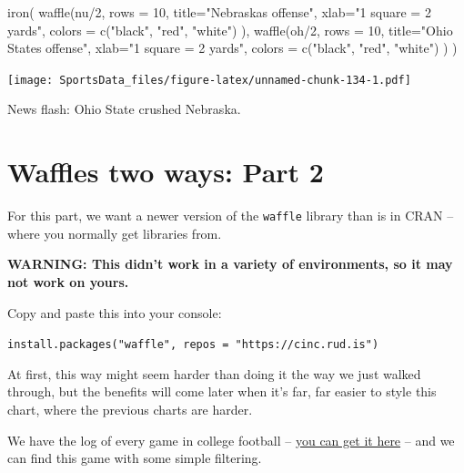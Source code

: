 \documentclass[
]{book}
\newenvironment{Shaded}{\begin{snugshade}}{\end{snugshade}}
\newcommand{\AttributeTok}[1]{\textcolor[rgb]{0.77,0.63,0.00}{#1}}
\newcommand{\DecValTok}[1]{\textcolor[rgb]{0.00,0.00,0.81}{#1}}
\newcommand{\FunctionTok}[1]{\textcolor[rgb]{0.00,0.00,0.00}{#1}}
\newcommand{\NormalTok}[1]{#1}
\newcommand{\SpecialCharTok}[1]{\textcolor[rgb]{0.00,0.00,0.00}{#1}}
\newcommand{\StringTok}[1]{\textcolor[rgb]{0.31,0.60,0.02}{#1}}
\begin{document}
\begin{Shaded}
\begin{Highlighting}[]
\FunctionTok{iron}\NormalTok{(}
 \FunctionTok{waffle}\NormalTok{(nu}\SpecialCharTok{/}\DecValTok{2}\NormalTok{, }
        \AttributeTok{rows =} \DecValTok{10}\NormalTok{, }
        \AttributeTok{title=}\StringTok{"Nebraska\textquotesingle{}s offense"}\NormalTok{, }
        \AttributeTok{xlab=}\StringTok{"1 square = 2 yards"}\NormalTok{, }
        \AttributeTok{colors =} \FunctionTok{c}\NormalTok{(}\StringTok{"black"}\NormalTok{, }\StringTok{"red"}\NormalTok{, }\StringTok{"white"}\NormalTok{)}
\NormalTok{        ),}
 \FunctionTok{waffle}\NormalTok{(oh}\SpecialCharTok{/}\DecValTok{2}\NormalTok{, }
        \AttributeTok{rows =} \DecValTok{10}\NormalTok{, }
        \AttributeTok{title=}\StringTok{"Ohio State\textquotesingle{}s offense"}\NormalTok{, }
        \AttributeTok{xlab=}\StringTok{"1 square = 2 yards"}\NormalTok{, }
        \AttributeTok{colors =} \FunctionTok{c}\NormalTok{(}\StringTok{"black"}\NormalTok{, }\StringTok{"red"}\NormalTok{, }\StringTok{"white"}\NormalTok{)}
\NormalTok{        )}
\NormalTok{)}
\end{Highlighting}
\end{Shaded}

\texttt{[image: SportsData\_files/figure-latex/unnamed-chunk-134-1.pdf]}

News flash: Ohio State crushed Nebraska.

\hypertarget{waffles-two-ways-part-2}{%
\section{Waffles two ways: Part 2}\label{waffles-two-ways-part-2}}

For this part, we want a newer version of the \texttt{waffle} library than is in CRAN -- where you normally get libraries from.

\textbf{WARNING: This didn't work in a variety of environments, so it may not work on yours.}

Copy and paste this into your console:

\texttt{install.packages("waffle",\ repos\ =\ "https://cinc.rud.is")}

At first, this way might seem harder than doing it the way we just walked through, but the benefits will come later when it's far, far easier to style this chart, where the previous charts are harder.

We have the log of every game in college football -- \href{https://unl.box.com/s/2prgq48ctoxlukn6kmfjw0u1opda5s0m}{you can get it here} -- and we can find this game with some simple filtering.
\end{document}

